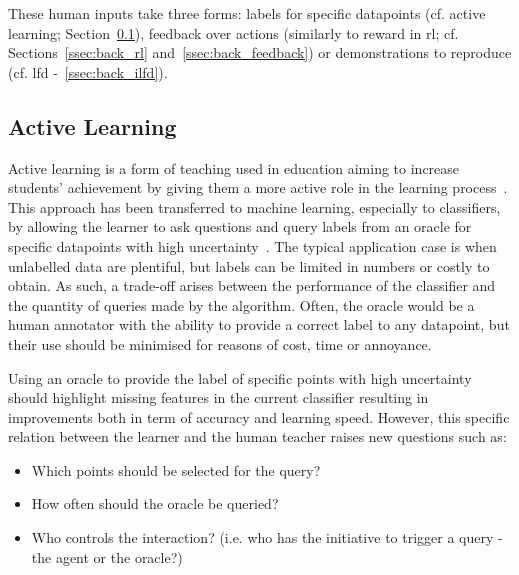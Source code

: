 These human inputs take three forms: labels for specific datapoints (cf. active learning; Section~\ref{ssec:back_active}), feedback over actions (similarly to reward in \gls{rl}; cf. Sections~\ref{ssec:back_rl} and~\ref{ssec:back_feedback}) or demonstrations to reproduce (cf. \gls{lfd} -~\ref{ssec:back_ilfd}).

\subsection{Active Learning} \label{ssec:back_active}

Active learning is a form of teaching used in education aiming to increase students' achievement by giving them a more active role in the learning process~\citep{johnson1991active}. This approach has been transferred to machine learning, especially to classifiers, by allowing the learner to ask questions and query labels from an oracle for specific datapoints with high uncertainty~\citep{settles2012active}. The typical application case is when unlabelled data are plentiful, but labels can be limited in numbers or costly to obtain. As such, a trade-off arises between the performance of the classifier and the quantity of queries made by the algorithm. Often, the oracle would be a human annotator with the ability to provide a correct label to any datapoint, but their use should be minimised for reasons of cost, time or annoyance.

Using an oracle to provide the label of specific points with high uncertainty should highlight missing features in the current classifier resulting in improvements both in term of accuracy and learning speed. However, this specific relation between the learner and the human teacher raises new questions such as: 
\begin{itemize}
	\item Which points should be selected for the query?
	\item How often should the oracle be queried?
	\item Who controls the interaction? (i.e. who has the initiative to trigger a query - the agent or the oracle?)
\end{itemize}

